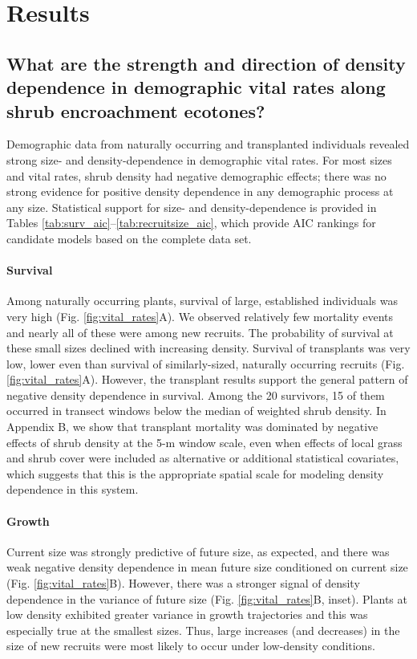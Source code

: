 \documentclass[11pt]{article}\usepackage[]{graphicx}\usepackage[]{color}
\begin{document}
\section*{Results}

\subsection*{What are the strength and direction of density dependence in demographic vital rates along shrub encroachment ecotones?}
Demographic data from naturally occurring and transplanted individuals revealed strong size- and density-dependence in demographic vital rates. 
For most sizes and vital rates, shrub density had negative demographic effects; there was no strong evidence for positive density dependence in any demographic process at any size. 
Statistical support for size- and density-dependence is provided in Tables \ref{tab:surv_aic}--\ref{tab:recruitsize_aic}, which provide AIC rankings for candidate models based on the complete data set. 

\paragraph{Survival}
Among naturally occurring plants, survival of large, established individuals was very high (Fig. \ref{fig:vital_rates}A).
We observed relatively few mortality events and nearly all of these were among new recruits. 
The probability of survival at these small sizes declined with increasing density. 
Survival of transplants was very low, lower even than survival of similarly-sized, naturally occurring recruits (Fig. \ref{fig:vital_rates}A). 
However, the transplant results support the general pattern of negative density dependence in survival. 
Among the 20 survivors, 15 of them occurred in transect windows below the median of weighted shrub density. 
In Appendix B, we show that transplant mortality was dominated by negative effects of shrub density at the 5-m window scale, even when effects of local grass and shrub cover were included as alternative or additional statistical covariates, which suggests that this is the appropriate spatial scale for modeling density dependence in this system. 

\paragraph{Growth}
Current size was strongly predictive of future size, as expected, and there was weak negative density dependence in mean future size conditioned on current size (Fig. \ref{fig:vital_rates}B). 
However, there was a stronger signal of density dependence in the variance of future size (Fig. \ref{fig:vital_rates}B, inset).
Plants at low density exhibited greater variance in growth trajectories and this was especially true at the smallest sizes. 
Thus, large increases (and decreases) in the size of new recruits were most likely to occur under low-density conditions. 
\end{document}
